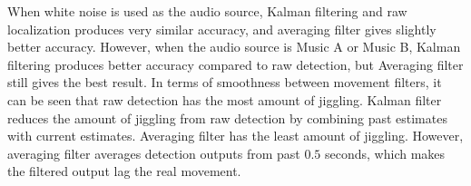 When white noise is used as the audio source, Kalman filtering and raw localization produces very similar accuracy, and averaging filter gives slightly better accuracy. However, when the audio source is Music A or Music B, Kalman filtering produces better accuracy compared to raw detection, but Averaging filter still gives the best result. In terms of smoothness between movement filters, it can be seen that raw detection has the most amount of jiggling. Kalman filter reduces the amount of jiggling from raw detection by combining past estimates with current estimates. Averaging filter has the least amount of jiggling. However, averaging filter averages detection outputs from past $0.5$ seconds, which makes the filtered output lag the real movement.

